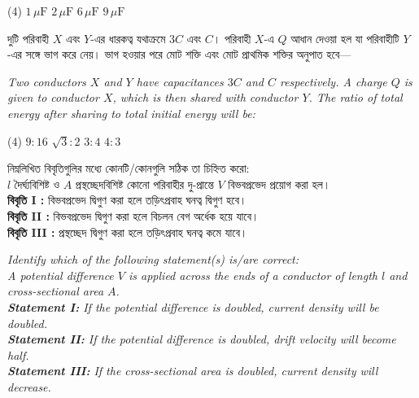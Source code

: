 \documentclass[13pt,a4paper]{extarticle}
\newcommand{\questionheader}[1]{%
  \vspace{0.4cm}\noindent{\Large\textbf{#1}}\vspace{0.12cm}%
}
\begin{document}
\begin{tasks}(4)
  \task $1\,\mu\text{F}$
  \task $2\,\mu\text{F}$
  \task $6\,\mu\text{F}$
  \task $9\,\mu\text{F}$
\end{tasks}

\questionheader{Question 3}

{\bengalifont দুটি পরিবাহী $X$ এবং $Y$-এর ধারকত্ব যথাক্রমে $3C$ এবং $C$। পরিবাহী $X$-এ $Q$ আধান দেওয়া হল যা পরিবাহীটি $Y$-এর সঙ্গে ভাগ করে নেয়। ভাগ হওয়ার পরে মোট শক্তি এবং মোট প্রাথমিক শক্তির অনুপাত হবে—}

\vspace{0.08cm}
\textit{Two conductors $X$ and $Y$ have capacitances $3C$ and $C$ respectively. A charge $Q$ is given to conductor $X$, which is then shared with conductor $Y$. The ratio of total energy after sharing to total initial energy will be:}

\begin{tasks}(4)
  \task $9:16$
  \task $\sqrt{3}:2$
  \task $3:4$
  \task $4:3$
\end{tasks}

\questionheader{Question 4}

{\bengalifont
নিম্নলিখিত বিবৃতিগুলির মধ্যে কোনটি/কোনগুলি সঠিক তা চিহ্নিত করো:\\
$l$ দৈর্ঘ্যবিশিষ্ট ও $A$ প্রস্থচ্ছেদবিশিষ্ট কোনো পরিবাহীর দু-প্রান্তে $V$ বিভবপ্রভেদ প্রয়োগ করা হল।\\
\textbf{বিবৃতি I :} বিভবপ্রভেদ দ্বিগুণ করা হলে তড়িৎপ্রবাহ ঘনত্ব দ্বিগুণ হবে।\\
\textbf{বিবৃতি II :} বিভবপ্রভেদ দ্বিগুণ করা হলে বিচলন বেগ অর্ধেক হয়ে যাবে।\\
\textbf{বিবৃতি III :} প্রস্থচ্ছেদ দ্বিগুণ করা হলে তড়িৎপ্রবাহ ঘনত্ব কমে যাবে।
}

\vspace{0.08cm}
\textit{Identify which of the following statement(s) is/are correct:\\
A potential difference $V$ is applied across the ends of a conductor of length $l$ and cross-sectional area $A$.\\
\textbf{Statement I:} If the potential difference is doubled, current density will be doubled.\\
\textbf{Statement II:} If the potential difference is doubled, drift velocity will become half.\\
\textbf{Statement III:} If the cross-sectional area is doubled, current density will decrease.}
\end{document}
